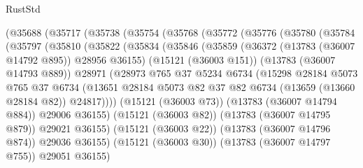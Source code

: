 \begin{lexlean}{RustStd}
\begin{coremodule}
          (@35688
            (@35717
              (@35738
                (@35754
                  (@35768
                    (@35772
                      (@35776
                        (@35780
                          (@35784
                            (@35797
                              (@35810
                                (@35822
                                  (@35834
                                    (@35846
                                      (@35859
                                        (@36372 (@13783 (@36007 @14792 @895)) @28956 @36155)
                                        (@15121 (@36003 @151))
                                        (@13783 (@36007 @14793 @889))
                                        @28971
                                        (@28973
                                          @765
                                          @37
                                          @5234
                                          @6734
                                          (@15298
                                            @28184
                                            @5073
                                            @765
                                            @37
                                            @6734
                                            (@13651
                                              @28184
                                              @5073
                                              @82
                                              @37
                                              @82
                                              @6734
                                              (@13659 (@13660 @28184 @82))
                                              @24817))))
                                      (@15121 (@36003 @73))
                                      (@13783 (@36007 @14794 @884))
                                      @29006
                                      @36155)
                                    (@15121 (@36003 @82))
                                    (@13783 (@36007 @14795 @879))
                                    @29021
                                    @36155)
                                  (@15121 (@36003 @22))
                                  (@13783 (@36007 @14796 @874))
                                  @29036
                                  @36155)
                                (@15121 (@36003 @30))
                                (@13783 (@36007 @14797 @755))
                                @29051
                                @36155)

\end{coremodule}
\end{lexlean}
